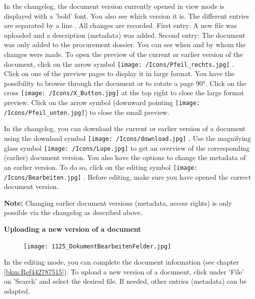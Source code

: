  In the changelog, the document version currently opened in view mode is displayed with a 'bold' font. You also see which version it is. The different entries are separated by a line . All changes are recorded. First entry: A new file was uploaded and a description (metadata) was added. Second entry: The document was only added to the procurement dossier. You can see when and by whom the changes were made. To open the preview of the current or earlier version of the document, click on the arrow symbol \texttt{[image: /Icons/Pfeil\_rechts.jpg]} . Click on one of the preview pages to display it in large format. You have the possibility to browse through the document or to rotate a page 90°. Click on the cross \texttt{[image: /Icons/X\_Button.jpg]} at the top right to close the large format preview. Click on the arrow symbol (downward pointing \texttt{[image: /Icons/Pfeil\_unten.jpg]}) to close the small preview.

In the changelog, you can download the current or earlier version of a document using the download symbol \texttt{[image: /Icons/download.jpg]} . Use the magnifying glass symbol \texttt{[image: /Icons/Lupe.jpg]}  to get an overview of the corresponding (earlier) document version. You also have the options to change the metadata of an earlier version. To do so, click on the editing symbol \texttt{[image: /Icons/Bearbeiten.jpg]} . Before editing, make sure you have opened the correct document version.

\vspace{\baselineskip}

\textbf{Note:} Changing earlier document versions (metadata, access rights) is only possible via the changelog as described above.

\pagebreak

\textbf{Uploading a new version of a document}

\vspace{\baselineskip}

\begin{figure}
\vspace{-35pt}
\texttt{[image: 1125\_DokumentBearbeitenFelder.jpg]}
\end{figure}
In the editing mode, you can complete the document information (see chapter \ref{bkm:Ref442787515}). To upload a new version of a document, click under 'File' on 'Search'  and select the desired file. If needed, other entries (metadata) can be adapted.

